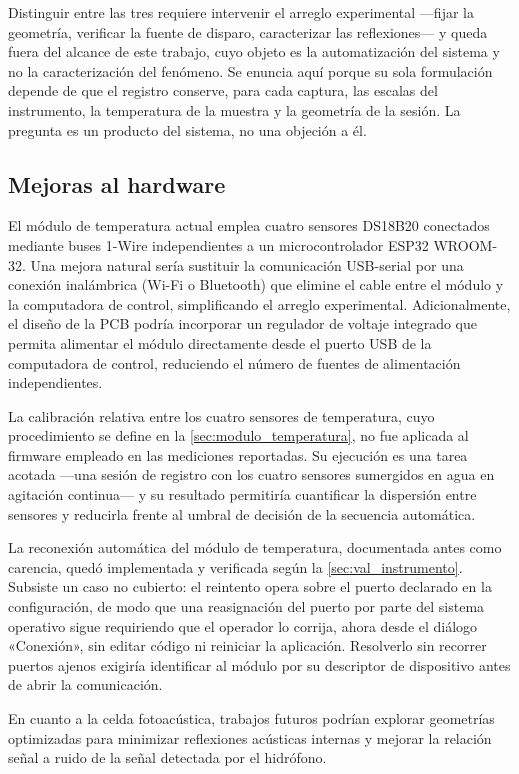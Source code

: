 Distinguir entre las tres requiere intervenir el arreglo experimental
---fijar la geometría, verificar la fuente de disparo, caracterizar las
reflexiones--- y queda fuera del alcance de este trabajo, cuyo objeto
es la automatización del sistema y no la caracterización del fenómeno.
Se enuncia aquí porque su sola formulación depende de que el registro
conserve, para cada captura, las escalas del instrumento, la
temperatura de la muestra y la geometría de la sesión. La pregunta es
un producto del sistema, no una objeción a él.

\subsection*{Mejoras al hardware}

El módulo de temperatura actual emplea cuatro sensores DS18B20
conectados mediante buses 1-Wire independientes a un microcontrolador
ESP32 WROOM-32.
Una mejora natural sería sustituir la comunicación USB-serial por
una conexión inalámbrica (Wi-Fi o Bluetooth) que elimine el cable
entre el módulo y la computadora de control, simplificando el
arreglo experimental. Adicionalmente, el diseño de la PCB podría
incorporar un regulador de voltaje integrado que permita alimentar
el módulo directamente desde el puerto USB de la computadora de
control,
reduciendo el número de fuentes de alimentación independientes.

La calibración relativa entre los cuatro sensores de temperatura,
cuyo procedimiento se define en la \cref{sec:modulo_temperatura}, no
fue aplicada al firmware empleado en las mediciones reportadas. Su
ejecución es una tarea acotada ---una sesión de registro con los
cuatro sensores sumergidos en agua en agitación continua--- y su
resultado permitiría cuantificar la dispersión entre sensores y
reducirla frente al umbral de decisión de la secuencia automática.

La reconexión automática del módulo de temperatura, documentada antes
como carencia, quedó implementada y verificada según la
\cref{sec:val_instrumento}. Subsiste un caso no cubierto: el reintento
opera sobre el puerto declarado en la configuración, de modo que una
reasignación del puerto por parte del sistema operativo sigue
requiriendo que el operador lo corrija, ahora desde el diálogo
«Conexión», sin editar código ni reiniciar la aplicación. Resolverlo
sin recorrer puertos ajenos exigiría identificar al módulo por su descriptor de dispositivo antes
de abrir la comunicación.

En cuanto a la celda fotoacústica, trabajos futuros podrían explorar
geometrías optimizadas para minimizar reflexiones acústicas internas
y mejorar la relación señal a ruido de la señal detectada por el
hidrófono.

